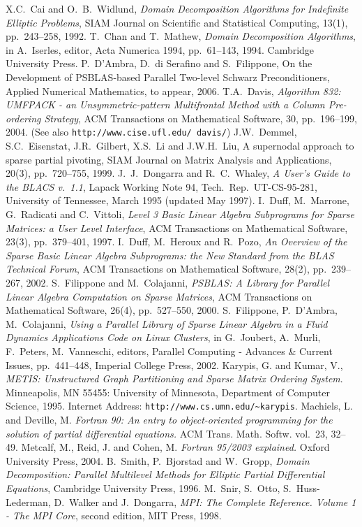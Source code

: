\documentclass[10pt,a4paper,twoside]{article}
\begin{document}
\begin{thebibliography}{99}
X.C.~Cai and O.~B.~Widlund,
{\em Domain Decomposition Algorithms for Indefinite Elliptic Problems},
SIAM Journal on Scientific and Statistical Computing, 13(1), pp.~243--258, 1992.
%
T.~Chan and T.~Mathew,
{\em Domain Decomposition Algorithms},
in A.~Iserles, editor, Acta Numerica 1994, pp.~61--143, 1994.
Cambridge University Press.
%
P.~D'Ambra, D.~di Serafino and S.~Filippone,
On the Development of PSBLAS-based Parallel Two-level Schwarz Preconditioners,
Applied Numerical Mathematics, to appear, 2006.
%
T.A.~Davis, 
{\em Algorithm 832: UMFPACK - an Unsymmetric-pattern Multifrontal
Method with a Column Pre-ordering Strategy},
ACM Transactions on Mathematical Software, 30, pp.~196--199, 2004.
(See also {\tt http://www.cise.ufl.edu/~davis/})
%
J.W.~Demmel, S.C.~Eisenstat, J.R.~Gilbert, X.S.~Li and J.W.H.~Liu,
A supernodal approach to sparse partial pivoting,
SIAM Journal on Matrix Analysis and Applications, 20(3), pp.~720--755, 1999.
%
J.~J.~Dongarra and R.~C.~Whaley,
{\em A User's Guide to the BLACS v.~1.1},
Lapack Working Note 94, Tech.\ Rep.\ UT-CS-95-281, University of
Tennessee, March 1995 (updated May 1997).
%
I.~Duff, M.~Marrone, G.~Radicati and C.~Vittoli,
{\em Level 3 Basic Linear Algebra Subprograms for Sparse Matrices: 
a User Level Interface},
ACM Transactions on Mathematical Software, 23(3), pp.~379--401, 1997.
%
I.~Duff, M.~Heroux and R.~Pozo,
{\em An Overview of the Sparse Basic Linear
Algebra Subprograms: the New Standard from the BLAS Technical Forum},
ACM Transactions on Mathematical Software, 28(2), pp.~239--267, 2002.
S.~Filippone and M.~Colajanni, 
{\em PSBLAS: A Library for Parallel Linear Algebra
Computation on Sparse Matrices},
\newblock
ACM Transactions on Mathematical Software, 26(4), pp.~527--550, 2000.
%
S.~Filippone, P.~D'Ambra, M.~Colajanni,
{\em Using a Parallel Library of Sparse Linear Algebra in a Fluid Dynamics 
Applications Code on Linux Clusters},
in G.~Joubert, A.~Murli, F.~Peters, M.~Vanneschi, editors,
Parallel Computing - Advances \& Current Issues,
pp.~441--448, Imperial College Press, 2002. 
%
Karypis, G. and Kumar, V.,
{\em {METIS}: Unstructured Graph Partitioning and Sparse Matrix
  Ordering System}.
Minneapolis, MN 55455: University of Minnesota, Department of
  Computer Science, 1995. 
Internet Address: {\verb|http://www.cs.umn.edu/~karypis|}.
{Machiels, L. and Deville, M.}
{\em Fortran 90: An entry to object-oriented programming for the solution
  of partial differential equations.}
{ACM Trans. Math. Softw.} vol.~{23}, 32--49.
{Metcalf, M., Reid, J. and Cohen, M.}
{\em Fortran 95/2003 explained.}
{Oxford University Press}, 2004.
%
B.~Smith, P.~Bjorstad and W.~Gropp,
{\em Domain Decomposition: Parallel Multilevel Methods for Elliptic
Partial Differential Equations},
Cambridge University Press, 1996.
%
M.~Snir, S.~Otto, S.~Huss-Lederman, D.~Walker and J.~Dongarra,
{\em MPI: The Complete Reference. Volume 1 - The MPI Core}, second edition,
MIT Press, 1998.
%
\end{thebibliography}
\end{document}
